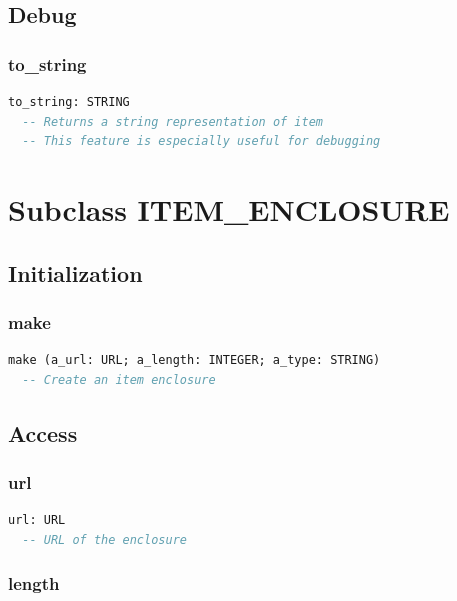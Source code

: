 \subsection{Debug}
\label{sec:item-debug}

\subsubsection{to\_string}

\begin{lstlisting}[language=Eiffel]
to_string: STRING
  -- Returns a string representation of item
  -- This feature is especially useful for debugging
\end{lstlisting}


\section{Subclass ITEM\_ENCLOSURE}
\label{sec:item-enclosure}

\subsection{Initialization}
\label{sec:item-enclosure-initialization}

\subsubsection{make}

\begin{lstlisting}[language=Eiffel]
make (a_url: URL; a_length: INTEGER; a_type: STRING)
  -- Create an item enclosure
\end{lstlisting}

\subsection{Access}
\label{sec:item-enclosure-access}

\subsubsection{url}

\begin{lstlisting}[language=Eiffel]
url: URL
  -- URL of the enclosure
\end{lstlisting}

\subsubsection{length}

